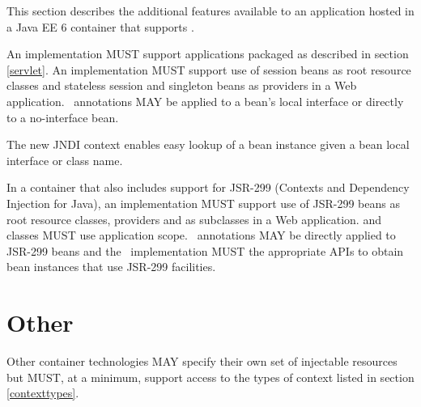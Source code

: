 This section describes the additional features available to an application hosted in a Java EE 6 container that supports \jaxrs.

An implementation MUST support applications packaged as described in section \ref{servlet}. An implementation MUST support use of session beans as root resource classes and stateless session and singleton beans as providers in a Web application. \jaxrs\ annotations MAY be applied to a bean's local interface or directly to a no-interface bean.

\begin{note}The new  JNDI context enables easy lookup of a bean instance given a bean local interface or class name.\end{note}

In a container that also includes support for JSR-299 (Contexts and Dependency Injection for Java), an implementation MUST support use of JSR-299 beans as root resource classes, providers and as  subclasses in a Web application.  and  classes MUST use application scope. \jaxrs\ annotations MAY be directly applied to JSR-299 beans and the \jaxrs\ implementation MUST the appropriate APIs to obtain bean instances that use JSR-299 facilities.

\section{Other}

Other container technologies MAY specify their own set of injectable resources but MUST, at a minimum, support access to the types of context listed in section \ref{contexttypes}.